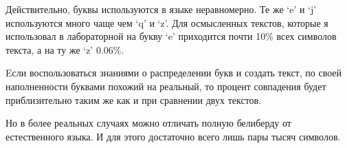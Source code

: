 \documentclass[12pt]{article}
\begin{document}
Действительно, буквы используются в языке неравномерно. Те же `e' и `j' используются много чаще чем
`q' и `z'. Для осмысленных текстов, которые я использовал в лабораторной на букву `e' приходится
почти 10\% всех символов текста, а на ту же `z' 0.06\%.

Eсли воспользоваться знаниями о распределении букв и создать текст, по своей наполненности буквами
похожий на реальный, то процент совпадения будет приблизительно таким же как и при сравнении двух
текстов.

Но в более реальных случаях можно отличать полную белиберду от естественного языка. И для этого
достаточно всего лишь пары тысяч символов.
\end{document}
